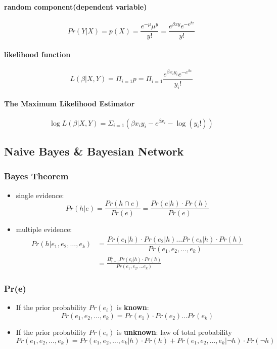 \paragraph{random component(dependent variable)}
$$Pr(Y|X) = p(X) = \dfrac{e^{-\mu} \mu^y}{y!} = \dfrac{e^{\beta xy} e^{-e^{\beta x}}}{y!}$$

\paragraph{likelihood function}
$$L(\beta|X,Y) = \Pi_{i=1} p = \Pi_{i=1} \dfrac{e^{\beta x_iy_i} e^{-e^{\beta x}}}{y_i!}$$

\paragraph{The Maximum Likelihood Estimator} 
$$\log L(\beta | X,Y) = \Sigma_{i=1} (\beta x_iy_i - e^{\beta x_i} - \log(y_i!))$$





\subsection{Naive Bayes \& Bayesian Network}
\subsubsection{Bayes Theorem}
\begin{itemize}
	\item single evidence: $$Pr(h|e) = \frac{Pr(h \cap e)}{Pr(e)} = \dfrac{Pr(e|h) \cdot Pr(h)}{Pr(e)}$$
	\item multiple evidence: 
	\begin{align*}
		Pr(h|e_1, e_2, \dots, e_k) &= \dfrac{Pr(e_1 | h) \cdot Pr(e_2 | h) \dots Pr(e_k | h) \cdot Pr(h)}{Pr(e_1, e_2, \dots, e_k)} \\ 
		&= \frac{\Pi_{i=1}^k Pr(e_i|h) \cdot Pr(h)}{Pr(e_1,e_2, \dots e_k)}
	\end{align*}
\end{itemize}

	
\subsubsection{Pr(e)}
\begin{itemize}
	\item If the prior probability $Pr(e_i)$ is \textbf{known}: 
	$$Pr(e_1, e_2, \dots, e_k) = Pr(e_1)\cdot Pr(e_2)\dots Pr(e_k)$$
	\item If the prior probability $Pr(e_i)$ is \textbf{unknown}: law of total probability
	$$Pr(e_1, e_2, \dots, e_k) = Pr(e_1, e_2, \dots, e_k|h)\cdot Pr(h) + Pr(e_1, e_2, \dots, e_k | \neg h) \cdot Pr(\neg h)$$
\end{itemize}

